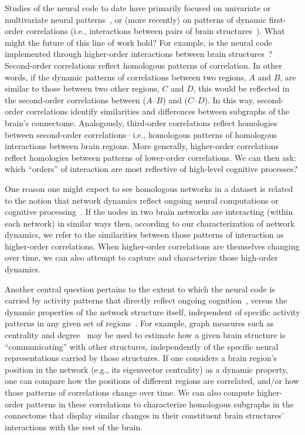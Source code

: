 \documentclass[english]{article}
\begin{document}
Studies of the neural code to date have primarily focused on
univariate or multivariate neural patterns~\cite{NormEtal06b}, or (more recently) on patterns of dynamic
first-order correlations (i.e., interactions between pairs of
brain structures~\cite{MannEtal18, FongEtal19, LuriEtal18, PretEtal17,
  ZouEtal19, DemeEtal19}).  What might the future of this line of work
hold?  For example, is the neural code implemented through
higher-order interactions between brain structures~\cite{ReimEtal17}?  Second-order correlations reflect
homologous patterns of correlation.  In other words, if the
dynamic patterns of correlations between two regions, $A$ and $B$, are
similar to those between two other regions, $C$ and $D$, this would be
reflected in the second-order correlations between ($A$--$B$) and
($C$--$D$).  In this way, second-order correlations identify
similarities and differences between subgraphs of the brain's
connectome.  Analogously, third-order correlations reflect homologies
between second-order correlations-- i.e., homologous patterns of
homologous interactions between brain regions.  More generally,
higher-order correlations reflect homologies between patterns of
lower-order correlations.  We can then ask: which ``orders'' of
interaction are most reflective of high-level cognitive processes?

One reason one might expect to see homologous networks in a dataset is
related to the notion that network dynamics reflect ongoing neural
computations or cognitive processing~\cite{BeatEtal16}.  If
the nodes in two brain networks are interacting (within each network)
in similar ways then, according to our characterization of network
dynamics, we refer to the similarities between those patterns of
interaction as higher-order correlations.  When higher-order
correlations are themselves changing over time, we can also attempt to
capture and characterize those high-order dynamics.

Another central question pertains to the extent to which the neural
code is carried by activity patterns that directly reflect ongoing
cognition~\cite{HaxbEtal01, NormEtal06b}, versus
the dynamic properties of the network structure itself, independent of
specific activity patterns in any given set of regions~\cite{BassEtal06}.  For example, graph measures such as
centrality and degree~\cite{BullSpor09} may be used to estimate how a
given brain structure is ``communicating'' with other structures,
independently of the specific neural representations carried by those
structures.  If one considers a brain region's position in the network
(e.g., its eigenvector centrality) as a dynamic property, one can
compare how the positions of different regions are correlated, and/or
how those patterns of correlations change over time.  We can also
compute higher-order patterns in these correlations to characterize
homologous subgraphs in the connectome that display similar changes in
their constituent brain structures' interactions with the rest of the
brain.
\end{document}
